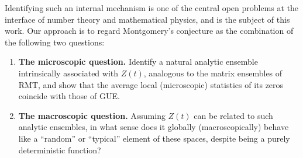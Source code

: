 \documentclass[12pt,reqno]{amsart}
\theoremstyle{plain}
\theoremstyle{definition}
\theoremstyle{remark}
\begin{document}
Identifying such an internal mechanism is one of the central open problems at the interface of number theory and mathematical physics, and is the subject of this work. Our approach is to regard Montgomery's conjecture as the combination of the following two questions:
\begin{enumerate}
\item \textbf{The microscopic question.}  
Identify a natural analytic ensemble intrinsically associated with \(Z(t)\), analogous to the matrix ensembles of RMT, and show that the average local (microscopic) statistics of its zeros coincide with those of GUE.
\item \textbf{The macroscopic question.}  
Assuming \(Z(t)\) can be related to such analytic ensembles, in what sense does it globally (macroscopically) behave like a ``random'' or ``typical'' element of these spaces, despite being a purely deterministic function?
\end{enumerate}
\end{document}
